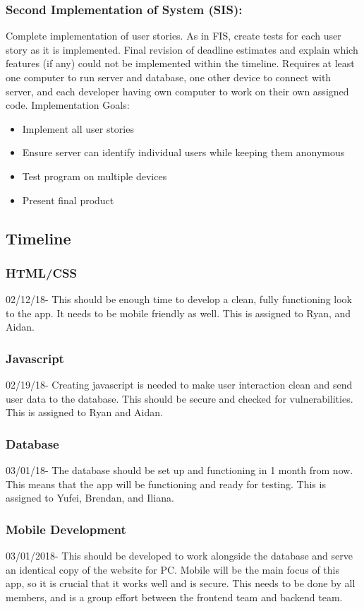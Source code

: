 \documentclass[12pt]{article}
\begin{document}
\subsubsection{Second Implementation of System (SIS):}
Complete implementation of user stories. As in FIS, create tests for each user
story as it is implemented. Final revision of deadline estimates and explain
which features (if any) could not be implemented within the timeline. Requires
at least one computer to run server and database, one other device to connect
with server, and each developer having own computer to work on their own
assigned code.
Implementation Goals:
\begin{itemize}
  \item Implement all user stories
  \item Ensure server can identify individual users while keeping them anonymous
  \item Test program on multiple devices
  \item Present final product
\end{itemize}

\subsection{Timeline}
\subsubsection{HTML/CSS}
	02/12/18- This should be enough time to develop a clean, fully functioning look to the app. It needs to be mobile friendly as well. This is assigned to Ryan, and Aidan.
\subsubsection{Javascript}
	02/19/18- Creating javascript is needed to make user interaction clean and send user data to the 	database. This should be secure and checked for vulnerabilities. This is assigned to Ryan and Aidan.
\subsubsection{Database}
	03/01/18- The database should be set up and functioning in 1 month from now. This means that 	the app will be functioning and ready for testing. This is assigned to Yufei, Brendan, and Iliana.
\subsubsection{Mobile Development}
	03/01/2018- This should be developed to work alongside the database and serve an identical 	copy of the website for PC. Mobile will be the main focus of this app, so it is crucial that it 	works well and is secure. This needs to be done by all members, and is a group effort between the frontend team and backend team.
\end{document}
